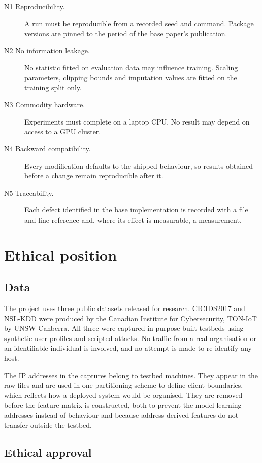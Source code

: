 \begin{description}
  \item[N1 Reproducibility.] A run must be reproducible from a recorded seed
    and command. Package versions are pinned to the period of the base paper's
    publication.
  \item[N2 No information leakage.] No statistic fitted on evaluation data may
    influence training. Scaling parameters, clipping bounds and imputation
    values are fitted on the training split only.
  \item[N3 Commodity hardware.] Experiments must complete on a laptop CPU. No
    result may depend on access to a GPU cluster.
  \item[N4 Backward compatibility.] Every modification defaults to the shipped
    behaviour, so results obtained before a change remain reproducible after
    it.
  \item[N5 Traceability.] Each defect identified in the base implementation is
    recorded with a file and line reference and, where its effect is
    measurable, a measurement.
\end{description}

\section{Ethical position}
\label{sec:ethics}

\subsection{Data}

The project uses three public datasets released for research. CICIDS2017 and
NSL-KDD were produced by the Canadian Institute for Cybersecurity, TON-IoT by
UNSW Canberra. All three were captured in purpose-built testbeds using
synthetic user profiles and scripted attacks. No traffic from a real
organisation or an identifiable individual is involved, and no attempt is made
to re-identify any host.

The IP addresses in the captures belong to testbed machines. They appear in the
raw files and are used in one partitioning scheme to define client boundaries,
which reflects how a deployed system would be organised. They are removed
before the feature matrix is constructed, both to prevent the model learning
addresses instead of behaviour and because address-derived features do not
transfer outside the testbed.

\subsection{Ethical approval}

